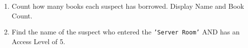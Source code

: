 \documentclass[12pt,a4paper]{article}
\begin{document}
\begin{enumerate}
    \item Count how many books each suspect has borrowed. Display Name and Book Count.







    \item Find the name of the suspect who entered the \texttt{'Server Room'} AND has an Access Level of 5.


\end{enumerate}
\end{document}

